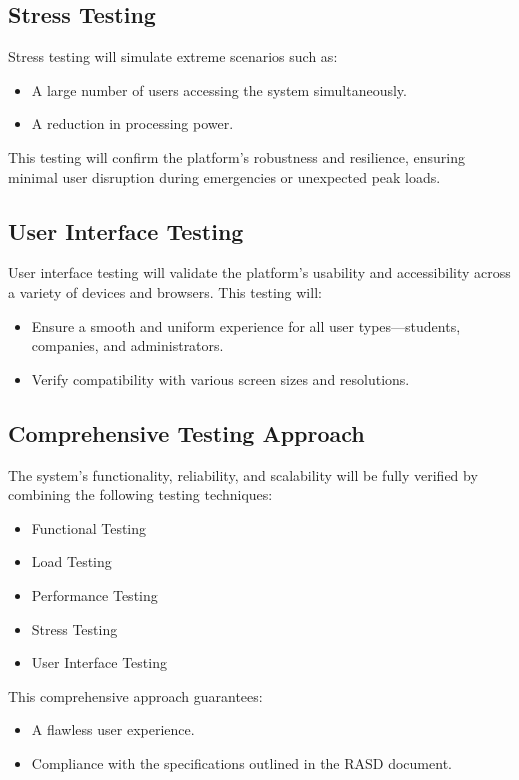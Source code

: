 \subsection{Stress Testing}
Stress testing will simulate extreme scenarios such as:
\begin{itemize}
    \item A large number of users accessing the system simultaneously.
    \item A reduction in processing power.
\end{itemize}
This testing will confirm the platform's robustness and resilience, ensuring minimal user disruption during emergencies or unexpected peak loads.

\subsection{User Interface Testing}
User interface testing will validate the platform's usability and accessibility across a variety of devices and browsers. This testing will:
\begin{itemize}
    \item Ensure a smooth and uniform experience for all user types—students, companies, and administrators.
    \item Verify compatibility with various screen sizes and resolutions.
\end{itemize}

\subsection{Comprehensive Testing Approach}
The system's functionality, reliability, and scalability will be fully verified by combining the following testing techniques:
\begin{itemize}
    \item Functional Testing
    \item Load Testing
    \item Performance Testing
    \item Stress Testing
    \item User Interface Testing
\end{itemize}
This comprehensive approach guarantees:
\begin{itemize}
    \item A flawless user experience.
    \item Compliance with the specifications outlined in the RASD document.
\end{itemize}
